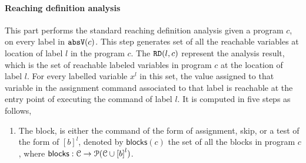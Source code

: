 \paragraph{Reaching definition analysis}
This part performs the standard reaching definition analysis given a program $c$, 
on 
every label in $\mathtt{abs}{\mathtt{V}}(c)$.  
This step generates set of all the reachable variables at location of label $l$ in the program $c$.
The $\mathtt{RD}(l, c)$ represent the analysis result, which is the set of 
reachable labeled variables in program $c$ at the location of label $l$.
For every labelled variable $x^l$ in this set, 
the value assigned to that variable
in the assignment command associated to that label is reachable at the entry point of  executing the command of label $l$.
It is computed in five steps as follows,
\begin{enumerate}
\item The block, 
is either the command of the form of assignment, skip, or a test of the form of $[b]^{l}$, 
denoted by $\mathsf{blocks}(c)$
the set of all the blocks 
in program $c$, where  $\mathsf{blocks}: \cdom \to \mathcal{P}(\cdom \cup \clabel{\bexpr}^{l})$.


\end{enumerate}
